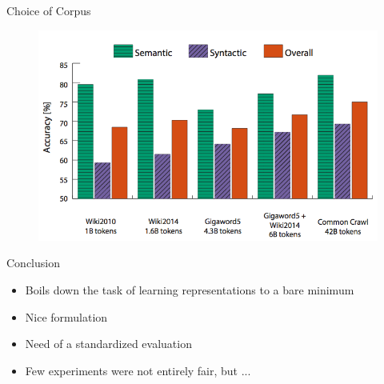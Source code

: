 \begin{frame}{Choice of Corpus}
  \begin{figure}
    \centering
    \includegraphics[scale=0.4]{images/corpus.png}
  \end{figure}
\end{frame}



\begin{frame}{Conclusion}
  \begin{itemize}
  \item Boils down the task of learning representations to a bare minimum
  \item Nice formulation
  \item Need of a standardized evaluation
  \item Few experiments were not entirely fair, but ...
  \end{itemize}
\end{frame}
